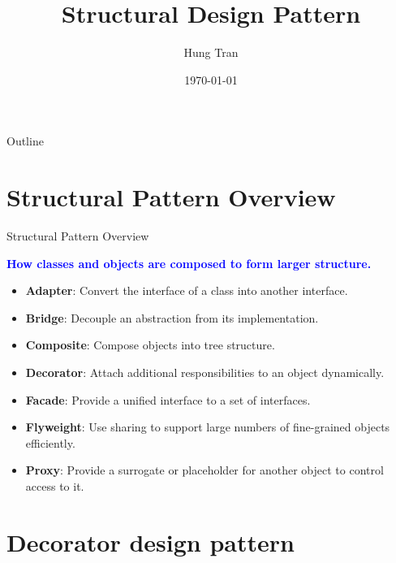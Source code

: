 \documentclass[13pt]{beamer}
\title[Design Pattern]{Structural Design Pattern}
\author{Hung Tran}
\institute{Fpt software}
\date{\today}
\begin{document}
\begin{frame}
	\titlepage
\end{frame}

\begin{frame}{Outline}
	\tableofcontents
\end{frame}

\section{Structural Pattern Overview}

\begin{frame}{Structural Pattern Overview}
	\begin{center}
		\textcolor{blue}{\textbf{How classes and objects are composed to form larger structure.}}
	\end{center}
	\begin{itemize}
		\item \textbf{Adapter}: Convert the interface of a class into another interface.
		\item \textbf{Bridge}: Decouple an abstraction from its implementation.
		\item \textbf{Composite}: Compose objects into tree structure.
		\item \textbf{Decorator}: Attach additional responsibilities to an object dynamically.
		\item \textbf{Facade}: Provide a unified interface to a set of interfaces.
		\item \textbf{Flyweight}: Use sharing to support large numbers of fine-grained objects efficiently.
		\item \textbf{Proxy}: Provide a surrogate or placeholder for another object to control access to it.
	\end{itemize}
\end{frame}

\section{Decorator design pattern}
\end{document}
